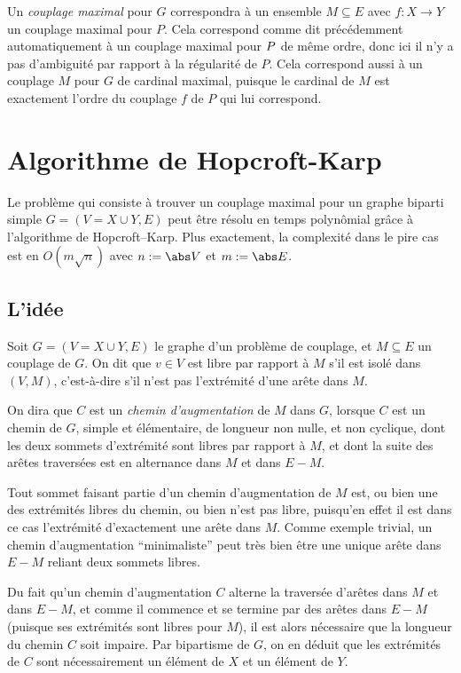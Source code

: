  Un \emph{couplage maximal} pour $G$ correspondra à un ensemble $M \subseteq E$ avec $f :X \to Y$ un couplage maximal pour $P$. Cela correspond comme dit précédemment automatiquement à un couplage maximal pour $P\-$ de même ordre, donc ici il n'y a pas d'ambiguité par rapport à la régularité de $P$. Cela correspond aussi à un couplage $M$ pour $G$ de cardinal maximal, puisque le cardinal de $M$ est exactement l'ordre du couplage $f$ de $P$ qui lui correspond.
 \SEP
 
 \section{Algorithme de Hopcroft-Karp}
 
 Le problème qui consiste à trouver un couplage maximal pour un graphe biparti simple $G = (V = X \cup Y,E)$ peut être résolu en temps polynômial grâce à l'algorithme de Hopcroft–Karp. Plus exactement, la complexité dans le pire cas est en $O(m \sqrt n)$ avec $n := \abs V$ et $m := \abs E$.
 
 \subsection{L'idée}
 
 \SEP\jdefi Soit $G = (V = X \cup Y, E)$ le graphe d'un problème de couplage, et $M \subseteq E$ un couplage de $G$. On dit que $v \in V$ est libre par rapport à $M$ s'il est isolé dans $(V,M)$, c'est-à-dire s'il n'est pas l'extrémité d'une arête dans $M$.
 
 On dira que $C$ est un \emph{chemin d'augmentation} de $M$ dans $G$, lorsque $C$ est un chemin de $G$, simple et élémentaire, de longueur non nulle, et non cyclique, dont les deux sommets d'extrémité sont libres par rapport à $M$, et dont la suite des arêtes traversées est en alternance dans $M$ et dans $E \minus M$.
 \SEP
 
 Tout sommet faisant partie d'un chemin d'augmentation de $M$ est, ou bien une des extrémités libres du chemin, ou bien n'est pas libre, puisqu'en effet il est dans ce cas l'extrémité d'exactement une arête dans $M$. Comme exemple trivial, un chemin d'augmentation ``minimaliste'' peut très bien être une unique arête dans $E\minus M$ reliant deux sommets libres.
 
 Du fait qu'un chemin d'augmentation $C$ alterne la traversée d'arêtes dans $M$ et dans $E\minus M$, et comme il commence et se termine par des arêtes dans $E\minus M$ (puisque ses extrémités sont libres pour $M$), il est alors nécessaire que la longueur du chemin $C$ soit impaire. Par bipartisme de $G$, on en déduit que les extrémités de $C$ sont nécessairement un élément de $X$ et un élément de $Y$.
 
